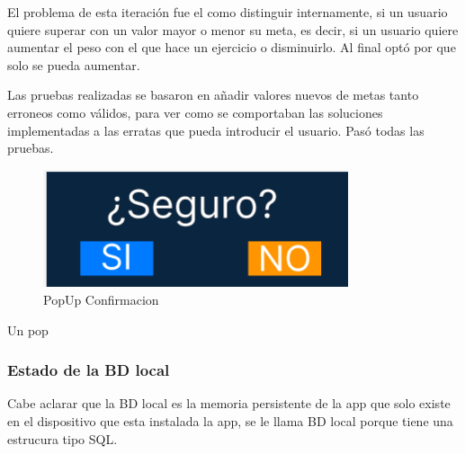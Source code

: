El problema de esta iteración fue el como distinguir internamente, si un usuario quiere superar con un valor mayor o menor su meta, es decir, si un usuario quiere aumentar el peso con el que hace un ejercicio o disminuirlo. Al final optó por que solo se pueda aumentar.

Las pruebas realizadas se basaron en añadir valores nuevos de metas tanto erroneos como válidos, para ver como se comportaban las soluciones implementadas a las erratas que pueda introducir el usuario. Pasó todas las pruebas.


\begin{figure}[H]
   \centering
    \includegraphics[width=0.8\textwidth]{pantallas/PopUpConfirmacion.png}
    \caption{PopUp Confirmacion}
    \label{fig:PopUpConfirmacion}
\end{figure}

Un pop

\subsubsection{Estado de la BD local}

Cabe aclarar que la BD local es la memoria persistente de la app que solo existe en el dispositivo que esta instalada la app, se le llama BD local porque tiene una estrucura tipo SQL.

